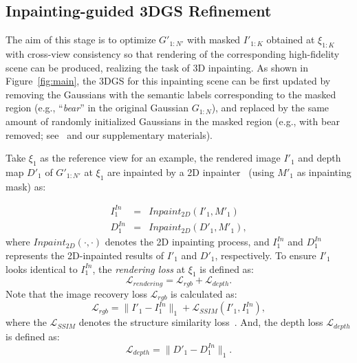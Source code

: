 \subsection{Inpainting-guided 3DGS Refinement}
\label{subsub:optimize}
The aim of this stage is to optimize $G'_{1:N'}$ with masked $I'_{1:K}$ obtained at $\xi_{1:K}$ with cross-view consistency so that rendering of the corresponding high-fidelity scene can be produced, realizing the task of 3D inpainting. As shown in Figure~\ref{fig:main}, the 3DGS for this inpainting scene can be first updated by removing the Gaussians with the semantic labels corresponding to the masked region (e.g., ``\textit{bear}'' in the original Gaussian $G_{1:N}$), and replaced by the same amount of randomly initialized Gaussians in the masked region (e.g., with bear removed; see~\cite{ye2023gaussiangrouping} and our supplementary materials). 

Take $\xi_1$ as the reference view for an example, the rendered image $I'_1$ and depth map $D'_1$ of $G'_{1:N'}$ at $\xi_1$ are inpainted by a 2D inpainter~\cite{lama, ldm} (using $M'_1$ as inpainting mask) as:

\begin{equation}
\label{eq:lrender}
\begin{aligned}
    I^{In}_1 & =  & Inpaint_{2D}(I'_1, M'_1) \\
    D^{In}_1 & = & Inpaint_{2D}(D'_1, M'_1),
\end{aligned}
\end{equation}
where $Inpaint_{2D}(\cdot, \cdot)$ denotes the 2D inpainting process, and $I^{In}_1$ and $D^{In}_1$ represents the 2D-inpainted results of $I'_1$ and $D'_1$, respectively.
To ensure $I'_1$ looks identical to $I^{In}_1$, the \textit{rendering loss} at $\xi_1$ is defined as:
\begin{equation}
\label{eq:lrender}
    \mathcal{L}_{rendering} = \mathcal{L}_{rgb} + \mathcal{L}_{depth}.
\end{equation}
Note that the image recovery loss $\mathcal{L}_{rgb}$ is calculated as:
\begin{equation}
\label{eq:optimageloss}
    \mathcal{L}_{rgb} = \| I'_1 - {I^{In}_1}\|_1 + \mathcal{L}_{SSIM}(I'_1, I^{In}_1),
\end{equation}
where the $\mathcal{L}_{SSIM}$ denotes the structure similarity loss~\cite{kerbl202333dgs}. And, the depth loss $\mathcal{L}_{depth}$ is defined as:
\begin{equation}
\label{eq:depthloss}
    \mathcal{L}_{depth} = \| D'_1 - {D^{In}_1}\|_1.
\end{equation}

